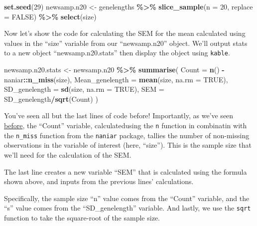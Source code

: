 \documentclass[
]{book}
\newenvironment{Shaded}{\begin{snugshade}}{\end{snugshade}}
\newcommand{\AttributeTok}[1]{\textcolor[rgb]{0.13,0.29,0.53}{#1}}
\newcommand{\ConstantTok}[1]{\textcolor[rgb]{0.56,0.35,0.01}{#1}}
\newcommand{\DecValTok}[1]{\textcolor[rgb]{0.00,0.00,0.81}{#1}}
\newcommand{\FunctionTok}[1]{\textcolor[rgb]{0.13,0.29,0.53}{\textbf{#1}}}
\newcommand{\NormalTok}[1]{#1}
\newcommand{\OtherTok}[1]{\textcolor[rgb]{0.56,0.35,0.01}{#1}}
\newcommand{\SpecialCharTok}[1]{\textcolor[rgb]{0.81,0.36,0.00}{\textbf{#1}}}
\begin{document}
\begin{Shaded}
\begin{Highlighting}[]
\FunctionTok{set.seed}\NormalTok{(}\DecValTok{29}\NormalTok{)}
\NormalTok{newsamp.n20 }\OtherTok{\textless{}{-}}\NormalTok{ genelengths }\SpecialCharTok{\%\textgreater{}\%}
  \FunctionTok{slice\_sample}\NormalTok{(}\AttributeTok{n =} \DecValTok{20}\NormalTok{, }\AttributeTok{replace =} \ConstantTok{FALSE}\NormalTok{) }\SpecialCharTok{\%\textgreater{}\%}
  \FunctionTok{select}\NormalTok{(size)}
\end{Highlighting}
\end{Shaded}

Now let's show the code for calculating the SEM for the mean calculated using values in the ``size'' variable from our ``newsamp.n20'' object. We'll output stats to a new object ``newsamp.n20.stats'' then display the object using \texttt{kable}.

\begin{Shaded}
\begin{Highlighting}[]
\NormalTok{newsamp.n20.stats }\OtherTok{\textless{}{-}}\NormalTok{ newsamp.n20 }\SpecialCharTok{\%\textgreater{}\%}
  \FunctionTok{summarise}\NormalTok{(}
    \AttributeTok{Count =} \FunctionTok{n}\NormalTok{() }\SpecialCharTok{{-}}\NormalTok{ naniar}\SpecialCharTok{::}\FunctionTok{n\_miss}\NormalTok{(size),}
    \AttributeTok{Mean\_genelength =} \FunctionTok{mean}\NormalTok{(size, }\AttributeTok{na.rm =} \ConstantTok{TRUE}\NormalTok{),}
    \AttributeTok{SD\_genelength =} \FunctionTok{sd}\NormalTok{(size, }\AttributeTok{na.rm =} \ConstantTok{TRUE}\NormalTok{),}
    \AttributeTok{SEM =}\NormalTok{ SD\_genelength}\SpecialCharTok{/}\FunctionTok{sqrt}\NormalTok{(Count)}
\NormalTok{  )}
\end{Highlighting}
\end{Shaded}

You've seen all but the last lines of code before! Importantly, as we've seen \hyperref[mean_sd]{before}, the ``Count'' variable, calculatedusing the \texttt{n} function in combinatin with the \texttt{n\_miss} function from the \texttt{naniar} package, tallies the number of non-missing observations in the variable of interest (here, ``size''). This is the sample size that we'll need for the calculation of the SEM.

The last line creates a new variable ``SEM'' that is calculated using the formula shown above, and inputs from the previous lines' calculations.

Specifically, the sample size ``n'' value comes from the ``Count'' variable, and the ``s'' value comes from the ``SD\_genelength'' variable. And lastly, we use the \texttt{sqrt} function to take the square-root of the sample size.
\end{document}
